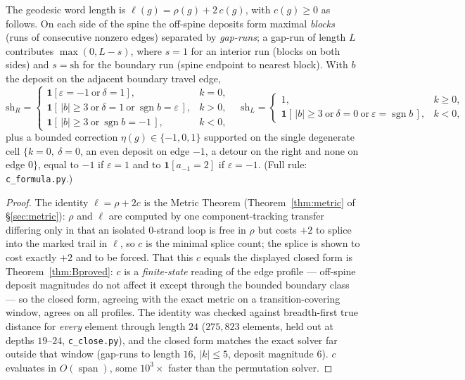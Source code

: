 \begin{theorem}\label{thm:wordlength}
The geodesic word length is $\ell(g)=\rho(g)+2\,c(g)$, with $c(g)\ge0$ as follows. On each side of
the spine the off-spine deposits form maximal \emph{blocks} (runs of consecutive nonzero edges)
separated by \emph{gap-runs}; a gap-run of length $L$ contributes $\max(0,L-s)$, where $s=1$ for an
interior run (blocks on both sides) and $s=\mathrm{sh}$ for the boundary run (spine endpoint to
nearest block). With $b$ the deposit on the adjacent boundary travel edge,
\[
\mathrm{sh}_R=\begin{cases}
\mathbf 1[\varepsilon=-1\ \text{or}\ \delta=1], & k=0,\\
\mathbf 1[\,|b|\ge3\ \text{or}\ \delta=1\ \text{or}\ \operatorname{sgn}b=\varepsilon\,], & k>0,\\
\mathbf 1[\,|b|\ge3\ \text{or}\ \operatorname{sgn}b=-1\,], & k<0,
\end{cases}
\quad
\mathrm{sh}_L=\begin{cases}1,&k\ge0,\\
\mathbf 1[\,|b|\ge3\ \text{or}\ \delta=0\ \text{or}\ \varepsilon=\operatorname{sgn}b\,],&k<0,\end{cases}
\]
plus a bounded correction $\eta(g)\in\{-1,0,1\}$ supported on the single degenerate cell
$\{k=0,\ \delta=0$, an even deposit on edge $-1$, a detour on the right and none on edge $0\}$,
equal to $-1$ if $\varepsilon=1$ and to $\mathbf 1[a_{-1}=2]$ if $\varepsilon=-1$. (Full rule:
\texttt{c\_formula.py}.)
\end{theorem}

\begin{proof}
The identity $\ell=\rho+2c$ is the Metric Theorem (Theorem~\ref{thm:metric} of \S\ref{sec:metric}):
$\rho$ and $\ell$ are computed by one component-tracking transfer differing only in that an isolated
$0$-strand loop is free in $\rho$ but costs $+2$ to splice into the marked trail in $\ell$, so $c$ is
the minimal splice count; the splice is shown to cost exactly $+2$ and to be forced. That this $c$
equals the displayed closed form is Theorem~\ref{thm:Bproved}: $c$ is a \emph{finite-state} reading of
the edge profile — off-spine deposit magnitudes do not affect it except through the bounded boundary
class — so the closed form, agreeing with the exact metric on a transition-covering window, agrees on
all profiles. The identity was checked against breadth-first true distance for \emph{every} element
through length $24$ ($275{,}823$ elements, held out at depths $19$--$24$, \texttt{c\_close.py}), and
the closed form matches the exact solver far outside that window (gap-runs to length $16$, $|k|\le5$,
deposit magnitude $6$). $c$ evaluates in $O(\operatorname{span})$, some $10^3\times$ faster than the
permutation solver. \end{proof}

